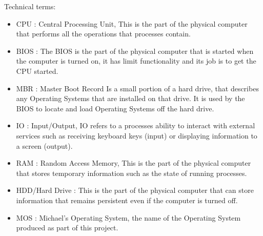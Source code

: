 \documentclass[a4paper]{report}
\begin{document}
\begin{minipage}{.5\textwidth}
  \centering
  Technical terms:
  \begin{itemize}
  \item CPU : Central Processing Unit, This is the part of the physical computer that performs all the operations that processes contain.
  \item BIOS : The BIOS is the part of the physical computer that is started when the computer is turned on, it has limit functionality and its job is to get the CPU started.
  \item MBR : Master Boot Record Is a small portion of a hard drive, that describes any Operating Systems that are installed on that drive. It is used by the BIOS to locate and load Operating Systems off the hard drive.
  \item IO : Input/Output, IO refers to a processes ability to interact with external services such as receiving keyboard keys (input) or displaying information to a screen (output).
  \item RAM : Random Access Memory, This is the part of the physical computer that stores temporary information such as the state of running processes.
  \item HDD/Hard Drive : This is the part of the physical computer that can store information that remains persistent even if the computer is turned off.
  \item MOS : Michael's Operating System, the name of the Operating System produced as part of this project.
  \end{itemize}
\end{minipage}%
\end{document}
